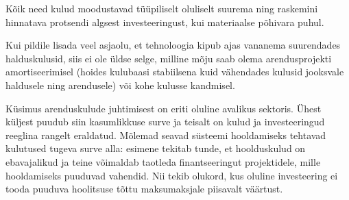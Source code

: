 \documentclass{tufte-book}
\begin{document}
Kõik need kulud moodustavad tüüpiliselt oluliselt suurema ning raskemini hinnatava protsendi algsest investeeringust, kui materiaalse põhivara puhul. 

Kui pildile lisada veel asjaolu, et tehnoloogia kipub ajas vananema suurendades halduskulusid, siis ei ole üldse selge, milline mõju saab olema arendusprojekti amortiseerimisel (hoides kulubaasi stabiilsena kuid vähendades kulusid jooksvale haldusele ning arendusele) või kohe kulusse kandmisel.

Küsimus arenduskulude juhtimisest on eriti oluline avalikus sektoris. Ühest küljest puudub siin kasumlikkuse surve ja teisalt on kulud ja investeeringud reeglina rangelt eraldatud. Mõlemad seavad süsteemi hooldamiseks tehtavad kulutused tugeva surve alla: esimene tekitab tunde, et hoolduskulud on ebavajalikud ja teine võimaldab taotleda finantseeringut projektidele, mille hooldamiseks puuduvad vahendid. Nii tekib olukord, kus oluline investeering ei tooda puuduva hoolitsuse tõttu maksumaksjale piisavalt väärtust. 
\end{document}

